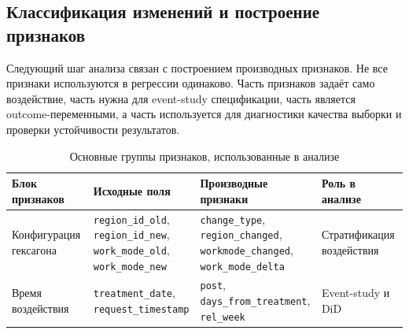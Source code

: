 \documentclass[14pt,a4paper]{extarticle}
\begin{document}
\subsection{Классификация изменений и построение признаков} 
\label{subsec:feature_engineering_results}

Следующий шаг анализа связан с построением производных признаков. Не все признаки используются в регрессии одинаково. Часть признаков задаёт само воздействие, часть нужна для event-study спецификации, часть является outcome-переменными, а часть используется для диагностики качества выборки и проверки устойчивости результатов.

\begin{table}[H]
    \centering
    \caption{Основные группы признаков, использованные в анализе}
    \label{tab:feature_table}
    \scriptsize
    \renewcommand{\arraystretch}{1.25}
    \setlength{\tabcolsep}{3pt}

    \begin{tabularx}{\textwidth}{
        >{\RaggedRight\arraybackslash}p{2.6cm}
        >{\RaggedRight\arraybackslash}X
        >{\RaggedRight\arraybackslash}X
        >{\RaggedRight\arraybackslash}p{3.0cm}
    }
        \toprule
        Блок признаков & Исходные поля & Производные признаки & Роль в анализе \\
        \midrule

        Конфигурация гексагона
        &
        \makecell[tl]{
            \texttt{region\_id\_old},\\
            \texttt{region\_id\_new},\\
            \texttt{work\_mode\_old},\\
            \texttt{work\_mode\_new}
        }
        &
        \makecell[tl]{
            \texttt{change\_type},\\
            \texttt{region\_changed},\\
            \texttt{workmode\_changed},\\
            \texttt{work\_mode\_delta}
        }
        &
        Стратификация воздействия \\
        \midrule

        Время воздействия
        &
        \makecell[tl]{
            \texttt{treatment\_date},\\
            \texttt{request\_timestamp}
        }
        &
        \makecell[tl]{
            \texttt{post},\\
            \texttt{days\_from\_treatment},\\
            \texttt{rel\_week}
        }
        &
        Event-study и DiD \\
        \midrule


\end{tabularx}
\end{table}
\end{document}
